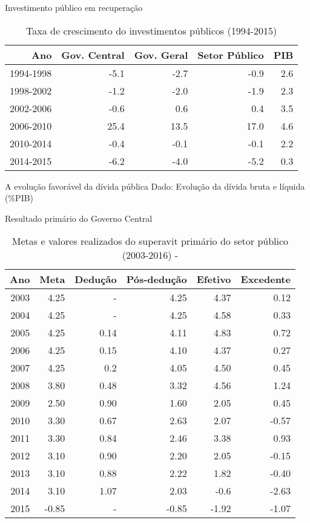 \documentclass[presentation]{beamer}
\begin{document}
\begin{frame}[label={sec:orga931a48}]{Investimento público em recuperação}
\begin{table}[htbp]
\caption{Taxa de crescimento do investimentos públicos (1994-2015) \cite{orair_investimento_2016}}
\centering
\begin{tabular}{rrrrr}
\hline
Ano & Gov. Central & Gov. Geral & Setor Público & PIB\\
\hline
1994-1998 & -5.1 & -2.7 & -0.9 & 2.6\\
1998-2002 & -1.2 & -2.0 & -1.9 & 2.3\\
2002-2006 & -0.6 & 0.6 & 0.4 & 3.5\\
2006-2010 & 25.4 & 13.5 & 17.0 & 4.6\\
2010-2014 & -0.4 & -0.1 & -0.1 & 2.2\\
2014-2015 & -6.2 & -4.0 & -5.2 & 0.3\\
\hline
\end{tabular}
\end{table}
\end{frame}

\begin{frame}[label={sec:org367f2cc}]{A evolução favorável da dívida pública}
\alert{Dado:} Evolução da dívida bruta e líquida (\%PIB)
\end{frame}

\begin{frame}[label={sec:orgffab23d}]{Resultado primário do Governo Central}
\begin{table}[htbp]
\caption{Metas e valores realizados do superavit primário do setor público (2003-2016) - \cite{orair_investimento_2016}}
\centering
\begin{tabular}{rrrrrr}
\hline
Ano & Meta & Dedução & Pós-dedução & Efetivo & Excedente\\
\hline
2003 & 4.25 & - & 4.25 & 4.37 & 0.12\\
2004 & 4.25 & - & 4.25 & 4.58 & 0.33\\
2005 & 4.25 & 0.14 & 4.11 & 4.83 & 0.72\\
2006 & 4.25 & 0.15 & 4.10 & 4.37 & 0.27\\
2007 & 4.25 & 0.2 & 4.05 & 4.50 & 0.45\\
2008 & 3.80 & 0.48 & 3.32 & 4.56 & 1.24\\
2009 & 2.50 & 0.90 & 1.60 & 2.05 & 0.45\\
2010 & 3.30 & 0.67 & 2.63 & 2.07 & -0.57\\
2011 & 3.30 & 0.84 & 2.46 & 3.38 & 0.93\\
2012 & 3.10 & 0.90 & 2.20 & 2.05 & -0.15\\
2013 & 3.10 & 0.88 & 2.22 & 1.82 & -0.40\\
2014 & 3.10 & 1.07 & 2.03 & -0.6 & -2.63\\
2015 & -0.85 & - & -0.85 & -1.92 & -1.07\\
\hline
\end{tabular}
\end{table}
\end{frame}
\end{document}
